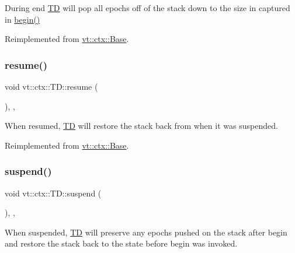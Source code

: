 During end {\ttfamily \hyperlink{structvt_1_1ctx_1_1_t_d}{TD}} will pop all epochs off of the stack down to the size in captured in {\ttfamily \hyperlink{structvt_1_1ctx_1_1_t_d_a5ba29186cd3ac75a48272e0ac050228b}{begin()}} 



Reimplemented from \hyperlink{structvt_1_1ctx_1_1_base_a113bac732b2831caa8eed11609ccaf0e}{vt\+::ctx\+::\+Base}.

\mbox{\label{structvt_1_1ctx_1_1_t_d_aa21b5afe01312244e338eefecde83bc6}} 
\subsubsection{\texorpdfstring{resume()}{resume()}}
{\footnotesize\ttfamily void vt\+::ctx\+::\+T\+D\+::resume (\begin{DoxyParamCaption}{ }\end{DoxyParamCaption})\hspace{0.3cm}{\ttfamily [final]}, {\ttfamily [override]}, {\ttfamily [virtual]}}



When resumed, {\ttfamily \hyperlink{structvt_1_1ctx_1_1_t_d}{TD}} will restore the stack back from when it was suspended. 



Reimplemented from \hyperlink{structvt_1_1ctx_1_1_base_a303afabb40ed83057fbe30c744db95da}{vt\+::ctx\+::\+Base}.

\mbox{\label{structvt_1_1ctx_1_1_t_d_aa0a190994d71eda5321da08464a810a9}} 
\subsubsection{\texorpdfstring{suspend()}{suspend()}}
{\footnotesize\ttfamily void vt\+::ctx\+::\+T\+D\+::suspend (\begin{DoxyParamCaption}{ }\end{DoxyParamCaption})\hspace{0.3cm}{\ttfamily [final]}, {\ttfamily [override]}, {\ttfamily [virtual]}}



When suspended, {\ttfamily \hyperlink{structvt_1_1ctx_1_1_t_d}{TD}} will preserve any epochs pushed on the stack after begin and restore the stack back to the state before begin was invoked. 



